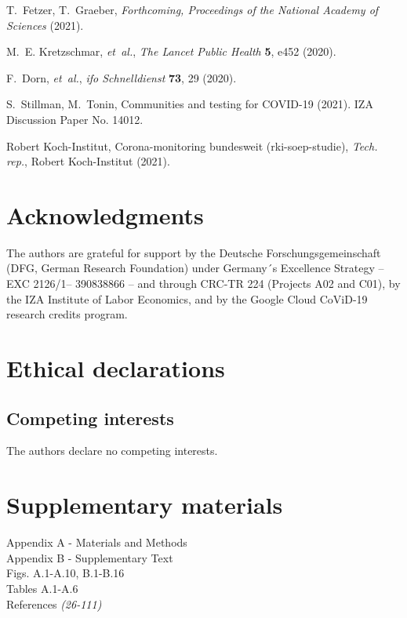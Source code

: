 \documentclass[12pt]{article}
\begin{document}
\begin{thebibliography}{10}
T.~Fetzer, T.~Graeber, {\it Forthcoming, Proceedings of the National Academy of
  Sciences\/}  (2021).

M.~E. Kretzschmar, {\it et~al.\/}, {\it The Lancet Public Health\/} {\bf 5},
  e452 (2020).

F.~Dorn, {\it et~al.\/}, {\it ifo Schnelldienst\/} {\bf 73}, 29 (2020).

S.~Stillman, M.~Tonin, Communities and testing for {COVID-19} (2021). IZA
  Discussion Paper No. 14012.

{Robert Koch-Institut}, Corona-monitoring bundesweit (rki-soep-studie), {\it
  Tech. rep.\/}, {Robert Koch-Institut} (2021).

\end{thebibliography}


\section*{Acknowledgments}

The authors are grateful for support by the Deutsche Forschungsgemeinschaft (DFG, German
Research Foundation) under Germany´s Excellence Strategy – EXC 2126/1– 390838866 – and
through CRC-TR 224 (Projects A02 and C01), by the IZA Institute of Labor Economics, and
by the Google Cloud CoViD-19 research credits program.

\section*{Ethical declarations}

\subsection*{Competing interests}

The authors declare no competing interests.


\section*{Supplementary materials}

Appendix A - Materials and Methods\\
Appendix B - Supplementary Text\\
Figs. A.1-A.10, B.1-B.16\\
Tables A.1-A.6\\
References \textit{(26-111)}
\end{document}
